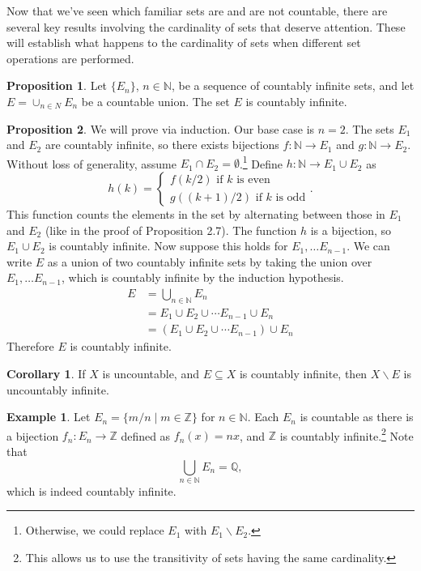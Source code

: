 \documentclass{article}
\newcommand{\N}{\mathbb{N}}
\newcommand{\Q}{\mathbb{Q}}
\newcommand{\Z}{\mathbb{Z}}
\theoremstyle{definition}
\newtheorem{proposition}{Proposition}[section]
\newtheorem{corollary}{Corollary}[section]
\newtheorem{example}{Example}[section]
\begin{document}
Now that we've seen which familiar sets are and are not countable, there are several key results involving the cardinality of sets that deserve attention. These will establish what happens to the cardinality of sets when different set operations are performed. 
\begin{proposition}
	Let $ \{E_n\} $, $ n\in\N $, be a sequence of countably infinite sets, and let $ E=\cup_{n\in N}E_n $ be a countable union. The set $ E $ is countably infinite. 
\end{proposition}
\begin{proposition}
	We will prove via induction. Our base case is $ n=2 $. The sets $ E_1 $ and $ E_2 $ are countably infinite, so there exists bijections $ f:\N\to E_1 $ and $ g:\N\to E_2 $. Without loss of generality, assume $ E_1\cap E_2=\emptyset $.\footnote{Otherwise, we could replace $ E_1 $ with $ E_1\backslash E_2 $.} Define $ h:\N\to E_1\cup E_2 $ as $$ h(k)=\begin{cases}
	f(k/2)\text{ if }k  \text{ is even}\\
		g((k+1)/2)\text{ if }k  \text{ is odd}
	\end{cases}. $$ This function counts the elements in the set by alternating between those in $ E_1 $ and $ E_2 $ (like in the proof of Proposition 2.7). The function $ h $ is a bijection, so $ E_1\cup E_2 $ is countably infinite. Now suppose this holds for $ E_1,\ldots E_{n-1} $. We can write $ E $ as a union of two countably infinite sets by taking the union over $ E_1,\ldots E_{n-1} $, which is countably infinite by the induction hypothesis. 
	\begin{align*}
		E&=\bigcup_{n\in \N} E_n\\
		 &=E_1\cup E_2\cup\cdots E_{n-1}\cup E_n\\
		 &=(E_1\cup E_2\cup\cdots E_{n-1})\cup E_n
	\end{align*} 
	Therefore $ E $ is countably infinite. 
\end{proposition}
\begin{corollary}
	If $ X $ is uncountable, and $ E\subseteq X $ is countably infinite, then $ X\backslash E$ is uncountably infinite.
\end{corollary}
\begin{example}
	Let $ E_n=\{m/n\mid m\in\Z\} $ for $ n\in\N $. Each $ E_n $ is countable as there is a bijection $ f_n:E_n\to\Z $ defined as $ f_n(x)=nx $, and $ \Z $ is countably infinite.\footnote{This allows us to use the transitivity of sets having the same cardinality.} Note that $$\bigcup_{n\in \N}E_n=\Q, $$ which is indeed countably infinite. 
\end{example}
\end{document}
